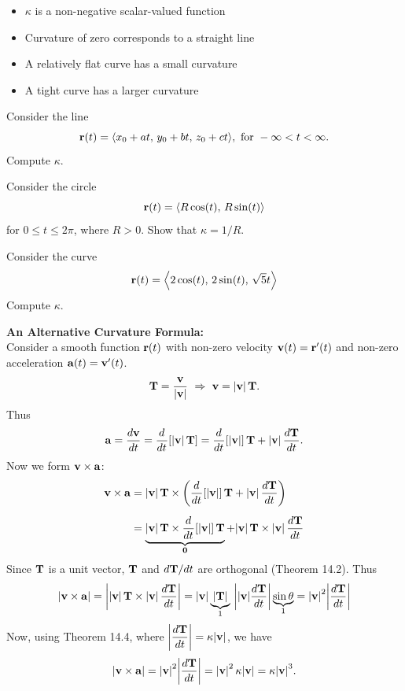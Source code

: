 \documentclass[../mathNotesPreamble]{subfiles}
\begin{document}
  \begin{itemize}
    \item 
      $\kappa$ is a non-negative scalar-valued function
    \item 
      Curvature of zero corresponds to a straight line
    \item 
      A relatively flat curve has a small curvature
    \item 
      A tight curve has a larger curvature
  \end{itemize}

  \begin{ex*}
    Consider the line
      \[{\mathbf{r}}(t)={\left\langle x_0+at,\,y_0+bt,\,z_0+ct \right\rangle},\textnormal{ for }-\infty<t<\infty.\]
    Compute $\kappa$.
  \end{ex*}

  \pagebreak

  \begin{ex*}
    Consider the circle
      \[{\mathbf{r}}(t)={\left\langle R\cos(t),\,R\sin(t) \right\rangle}\]
    for $0\leq t\leq 2\pi$, where $R>0$. Show that $\kappa=1/R$.
  \end{ex*}

  \begin{ex*}
    Consider the curve
      \[{\mathbf{r}}(t)={\left\langle 2\cos(t),\,2\sin(t),\,\sqrt{5}t \right\rangle}\]
    Compute $\kappa$.
  \end{ex*}

  \pagebreak
  \textbf{An Alternative Curvature Formula:}\\
  Consider a smooth function ${\mathbf{r}}(t)$ with non-zero velocity ${\mathbf{v}}(t)={\mathbf{r}}'(t)$ and non-zero acceleration ${\mathbf{a}}(t)={\mathbf{v}}'(t)$. 
    \[\vecT=\frac{\vecv}{\abs{\vecv}}\ \Rightarrow\   \vecv=\abs{\vecv}\,\vecT.\]
  Thus
    \[{\mathbf{a}}=\frac{d{\mathbf{v}}}{dt}={\frac{d^{}}{dt^{}}}{\left[{\left\vert{\mathbf{v}}\right\vert}\,{\mathbf{T}}\right]}={\frac{d^{}}{dt^{}}}{\left[{\left\vert{\mathbf{v}}\right\vert}\right]}\,{\mathbf{T}}+{\left\vert{\mathbf{v}}\right\vert}\,\frac{d{\mathbf{T}}}{dt}.\]
  Now we form ${\mathbf{v}}\times{\mathbf{a}}$:
  \begin{align*}
    {\mathbf{v}}\times{\mathbf{a}}&={\left\vert{\mathbf{v}}\right\vert}\,{\mathbf{T}}\times{\left({\frac{d^{}}{dt^{}}}{\left[{\left\vert{\mathbf{v}}\right\vert}\right]}\,{\mathbf{T}}+{\left\vert{\mathbf{v}}\right\vert}\,\frac{d{\mathbf{T}}}{dt}\right)}\\[5pt]
      &=\underbrace{{\left\vert{\mathbf{v}}\right\vert}\,{\mathbf{T}}\times{\frac{d^{}}{dt^{}}}{\left[{\left\vert{\mathbf{v}}\right\vert}\right]}\,{\mathbf{T}}}_{\mathbf{0}}+{\left\vert{\mathbf{v}}\right\vert}\,{\mathbf{T}}\times{\left\vert{\mathbf{v}}\right\vert}\,\frac{d{\mathbf{T}}}{dt}
  \end{align*}
  Since ${\mathbf{T}}$ is a unit vector, ${\mathbf{T}}$ and $d{\mathbf{T}}/dt$ are orthogonal (Theorem 14.2). Thus
  \begin{align*}
    {\left\vert{\mathbf{v}}\times{\mathbf{a}}\right\vert}={\left\vert{\left\vert{\mathbf{v}}\right\vert}\,{\mathbf{T}}\times{\left\vert{\mathbf{v}}\right\vert}\,\frac{d{\mathbf{T}}}{dt}\right\vert}={\left\vert{\mathbf{v}}\right\vert}\underbrace{{\left\vert{\mathbf{T}}\right\vert}}_1\,{\left\vert{\left\vert{\mathbf{v}}\right\vert}\frac{d{\mathbf{T}}}{dt}\right\vert}\underbrace{\sin\theta}_1
      ={\left\vert{\mathbf{v}}\right\vert}^2 {\left\vert\frac{d{\mathbf{T}}}{dt}\right\vert}
  \end{align*}
  Now, using Theorem 14.4, where $\displaystyle{\left\vert\frac{d{\mathbf{T}}}{dt}\right\vert}=\kappa {\left\vert{\mathbf{v}}\right\vert}$, we have
    \[{\left\vert{\mathbf{v}}\times{\mathbf{a}}\right\vert}={\left\vert{\mathbf{v}}\right\vert}^2{\left\vert\frac{d{\mathbf{T}}}{dt}\right\vert}={\left\vert{\mathbf{v}}\right\vert}^2\,\kappa{\left\vert{\mathbf{v}}\right\vert}=\kappa{\left\vert{\mathbf{v}}\right\vert}^3.\]
\end{document}
